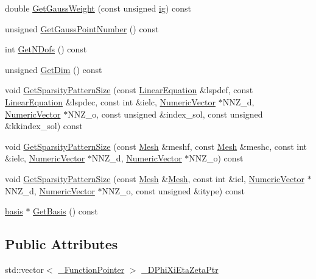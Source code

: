 \begin{DoxyCompactItemize}
double \mbox{\hyperlink{classfemus_1_1elem__type_a86dfc5d292bb86bb02ac13f5acbb6c98}{Get\+Gauss\+Weight}} (const unsigned \mbox{\hyperlink{namespacefemus_a6df31099f676311de214a312d7043941}{ig}}) const
\item 
unsigned \mbox{\hyperlink{classfemus_1_1elem__type_a3fa8f889f9ae97586b3db574acb4448e}{Get\+Gauss\+Point\+Number}} () const
\item 
int \mbox{\hyperlink{classfemus_1_1elem__type_a7597b01400759749a8b76e01722cd89b}{Get\+N\+Dofs}} () const
\item 
unsigned \mbox{\hyperlink{classfemus_1_1elem__type_aa94378d258af64d24a9970d30f229589}{Get\+Dim}} () const
\item 
void \mbox{\hyperlink{classfemus_1_1elem__type_a6e40b6760ceb52bc3a6d5959ab1588ba}{Get\+Sparsity\+Pattern\+Size}} (const \mbox{\hyperlink{classfemus_1_1_linear_equation}{Linear\+Equation}} \&lspdef, const \mbox{\hyperlink{classfemus_1_1_linear_equation}{Linear\+Equation}} \&lspdec, const int \&ielc, \mbox{\hyperlink{classfemus_1_1_numeric_vector}{Numeric\+Vector}} $\ast$N\+N\+Z\+\_\+d, \mbox{\hyperlink{classfemus_1_1_numeric_vector}{Numeric\+Vector}} $\ast$N\+N\+Z\+\_\+o, const unsigned \&index\+\_\+sol, const unsigned \&kkindex\+\_\+sol) const
\item 
void \mbox{\hyperlink{classfemus_1_1elem__type_a2e66f8115d7da31bc740db29e1524d60}{Get\+Sparsity\+Pattern\+Size}} (const \mbox{\hyperlink{classfemus_1_1_mesh}{Mesh}} \&meshf, const \mbox{\hyperlink{classfemus_1_1_mesh}{Mesh}} \&meshc, const int \&ielc, \mbox{\hyperlink{classfemus_1_1_numeric_vector}{Numeric\+Vector}} $\ast$N\+N\+Z\+\_\+d, \mbox{\hyperlink{classfemus_1_1_numeric_vector}{Numeric\+Vector}} $\ast$N\+N\+Z\+\_\+o) const
\item 
void \mbox{\hyperlink{classfemus_1_1elem__type_a9e3cfe2ed283c16125594e5c3a02c8cd}{Get\+Sparsity\+Pattern\+Size}} (const \mbox{\hyperlink{classfemus_1_1_mesh}{Mesh}} \&\mbox{\hyperlink{classfemus_1_1_mesh}{Mesh}}, const int \&iel, \mbox{\hyperlink{classfemus_1_1_numeric_vector}{Numeric\+Vector}} $\ast$N\+N\+Z\+\_\+d, \mbox{\hyperlink{classfemus_1_1_numeric_vector}{Numeric\+Vector}} $\ast$N\+N\+Z\+\_\+o, const unsigned \&itype) const
\item 
\mbox{\hyperlink{classfemus_1_1basis}{basis}} $\ast$ \mbox{\hyperlink{classfemus_1_1elem__type_a8d0ba58ed22eccd39304ba1d84a7b891}{Get\+Basis}} () const
\end{DoxyCompactItemize}
\subsection*{Public Attributes}
\begin{DoxyCompactItemize}
\item 
std\+::vector$<$ \mbox{\hyperlink{classfemus_1_1elem__type_ac6d3f8df5299550225a2f77c2aa15dde}{\+\_\+\+Function\+Pointer}} $>$ \mbox{\hyperlink{classfemus_1_1elem__type_acb75b2a53188353c30e56bf3899243e2}{\+\_\+\+D\+Phi\+Xi\+Eta\+Zeta\+Ptr}}
\end{DoxyCompactItemize}
